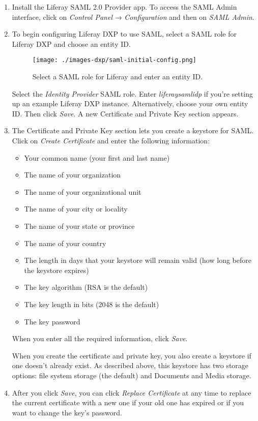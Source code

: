 \begin{enumerate}
\def\labelenumi{\arabic{enumi}.}
\item
  Install the Liferay SAML 2.0 Provider app. To access the SAML Admin
  interface, click on \emph{Control Panel} → \emph{Configuration} and
  then on \emph{SAML Admin}.
\item
  To begin configuring Liferay DXP to use SAML, select a SAML role for
  Liferay DXP and choose an entity ID.

  \begin{figure}
  \centering
  \texttt{[image: ./images-dxp/saml-initial-config.png]}
  \caption{Select a SAML role for Liferay and enter an entity ID.}
  \end{figure}

  Select the \emph{Identity Provider} SAML role. Enter
  \emph{liferaysamlidp} if you're setting up an example Liferay DXP
  instance. Alternatively, choose your own entity ID. Then click
  \emph{Save}. A new Certificate and Private Key section appears.
\item
  The Certificate and Private Key section lets you create a keystore for
  SAML. Click on \emph{Create Certificate} and enter the following
  information:

  \begin{itemize}
  \tightlist
  \item
    Your common name (your first and last name)
  \item
    The name of your organization
  \item
    The name of your organizational unit
  \item
    The name of your city or locality
  \item
    The name of your state or province
  \item
    The name of your country
  \item
    The length in days that your keystore will remain valid (how long
    before the keystore expires)
  \item
    The key algorithm (RSA is the default)
  \item
    The key length in bits (2048 is the default)
  \item
    The key password
  \end{itemize}

  When you enter all the required information, click \emph{Save}.

  When you create the certificate and private key, you also create a
  keystore if one doesn't already exist. As described above, this
  keystore has two storage options: file system storage (the default)
  and Documents and Media storage.
\item
  After you click \emph{Save}, you can click \emph{Replace Certificate}
  at any time to replace the current certificate with a new one if your
  old one has expired or if you want to change the key's password.


\end{enumerate}
